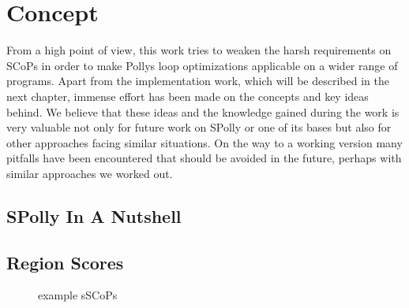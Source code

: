 
\chapter{Concept} %
\label{Chapter3}

From a high point of view, this work tries to weaken the harsh requirements on 
SCoPs in order to make Pollys loop optimizations applicable on a wider range of
programs. Apart from the implementation work, which will be described in the 
next chapter, immense effort has been made on the concepts and key ideas behind.
We believe that these ideas and the knowledge gained during the work is very 
valuable not only for future work on SPolly or one of its bases but also for
other approaches facing similar situations. On the way to a working version 
many pitfalls have been encountered that should be avoided in the future, 
perhaps with similar approaches we worked out. 


\section{SPolly In A Nutshell}


\section{Region Scores}

\lstset{frame=none}
\begin{wrapfigure}[]{r}{0.4\textwidth}
  \centering


  \caption{example sSCoPs}
  \label{fig:ScoredSCoPs}
\end{wrapfigure}
\resetlst

